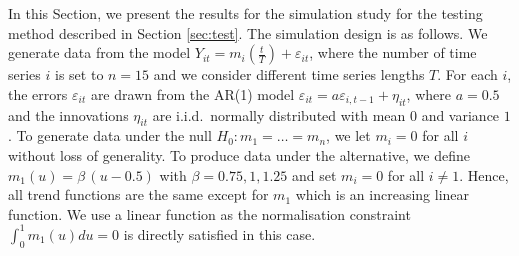 \documentclass[a4paper,12pt]{article}
\begin{document}
In this Section, we present the results for the simulation study for the testing method described in Section \ref{sec:test}. The simulation design is as follows. We generate data from the model $Y_{it} = m_i(\frac{t}{T}) + \varepsilon_{it}$, where the number of time series $i$ is set to $n = 15$ and we consider different time series lengths $T$. For each $i$, the errors $\varepsilon_{it}$ are drawn from the AR(1) model $\varepsilon_{it} = a \varepsilon_{i, t-1} + \eta_{it}$, where $a = 0.5$ and the innovations $\eta_{it}$ are i.i.d.\ normally distributed with mean $0$ and variance $1$. To generate data under the null $H_0: m_1 = \ldots = m_n$, we let $m_i = 0$ for all $i$ without loss of generality. To produce data under the alternative, we define $m_1(u) = \beta \, (u - 0.5) $ with $\beta = 0.75, 1, 1.25$ and set $m_i = 0$ for all $i \ne 1$. Hence, all trend functions are the same except for $m_1$ which is an increasing linear function. We use a linear function as the normalisation constraint $\int_0^1 m_1(u) du = 0$ is directly satisfied in this case. 
%
%
%
%
\end{document}
